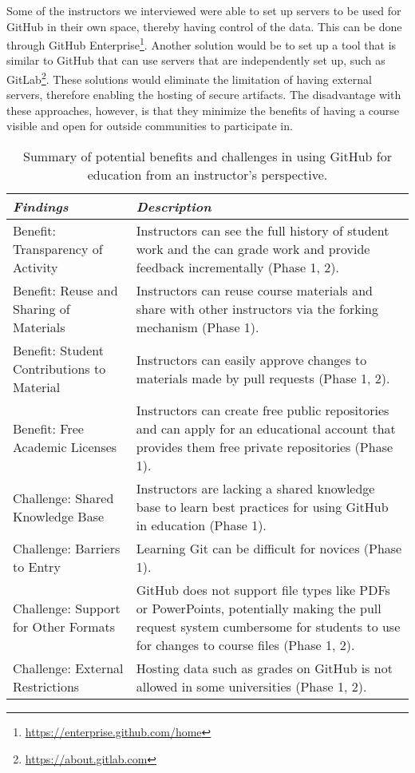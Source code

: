 Some of the instructors we interviewed were able to set up servers to be used for GitHub in their own space, thereby having control of the data. This can be done through GitHub Enterprise\footnote{\url{https://enterprise.github.com/home}}. Another solution would be to set up a tool that is similar to GitHub that can use servers that are independently set up, such as GitLab\footnote{\url{https://about.gitlab.com}}. These solutions would eliminate the limitation of having external servers, therefore enabling the hosting of secure artifacts. The disadvantage with these approaches, however, is that they minimize the benefits of having a course visible and open for outside communities to participate in.

\begin{table}[htp]
    \vspace{1pt}
        \caption{Summary of potential benefits and challenges in using GitHub for education from an instructor's perspective.}\label{table:findings:instructors}
    \vspace{1pt}
    \begin{center}
        \begin{tabular}{ | m{3cm} | m{12cm} | }
            \hline
            \emph{Findings} & \emph{Description} \\
            \hline
            Benefit: Transparency of Activity & Instructors can see the full history of student work and the can grade work and provide feedback incrementally (Phase 1, 2). \\
            \hline
            Benefit: Reuse and Sharing of Materials & Instructors can reuse course materials and share with other instructors via the forking mechanism (Phase 1). \\
            \hline
            Benefit: Student Contributions to Material & Instructors can easily approve changes to materials made by pull requests (Phase 1, 2). \\
            \hline
            Benefit: Free Academic Licenses & Instructors can create free public repositories and can apply for an educational account that provides them free private repositories (Phase 1). \\
            \hline
            Challenge: Shared Knowledge Base​ & Instructors are lacking a shared knowledge base to learn best practices for using GitHub in education (Phase 1). \\
            \hline
            Challenge: Barriers to Entry & Learning Git can be difficult for novices (Phase 1)​. \\
            \hline
            Challenge: Support for Other Formats & GitHub does not support file types like PDFs or PowerPoints, potentially making the pull request system cumbersome for students to use for changes to course files (Phase 1, 2). \\
            \hline
            Challenge: External Restrictions & Hosting data such as grades on GitHub is not allowed in some universities (Phase 1, 2). \\
            \hline
        \end{tabular}
    \end{center}
\end{table}

